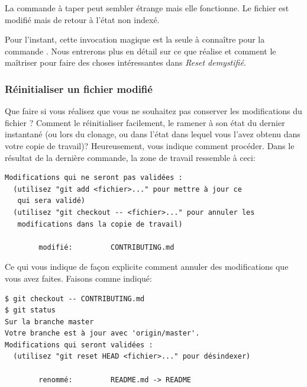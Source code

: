 La commande à taper peut sembler étrange mais elle fonctionne.
Le fichier  est modifié mais de retour à l'état non indexé.


Pour l'instant, cette invocation magique est la seule à connaître pour la commande .
Nous entrerons plus en détail sur ce que  réalise et comment le maîtriser pour faire des choses intéressantes dans \emph{Reset demystifié}.

\subsubsection{Réinitialiser un fichier modifié}

Que faire si vous réalisez que vous ne souhaitez pas conserver les modifications du fichier ?
Comment le réinitialiser facilement, le ramener à son état du dernier instantané (ou lors du clonage, ou dans l'état dans lequel vous l'avez obtenu dans votre copie de travail)?
Heureusement,  vous indique comment procéder.
Dans le résultat de la dernière commande, la zone de travail ressemble à ceci:
\begin{Schunk}
\begin{Verbatim}
Modifications qui ne seront pas validées :
  (utilisez "git add <fichier>..." pour mettre à jour ce
   qui sera validé)
  (utilisez "git checkout -- <fichier>..." pour annuler les
   modifications dans la copie de travail)

        modifié:         CONTRIBUTING.md
\end{Verbatim}
\end{Schunk}

Ce qui vous indique de façon explicite comment annuler des modifications que vous avez faites.
Faisons comme indiqué:
\begin{Schunk}
\begin{Verbatim}
$ git checkout -- CONTRIBUTING.md
$ git status
Sur la branche master
Votre branche est à jour avec 'origin/master'.
Modifications qui seront validées :
  (utilisez "git reset HEAD <fichier>..." pour désindexer)

        renommé:         README.md -> README
\end{Verbatim}
\end{Schunk}

